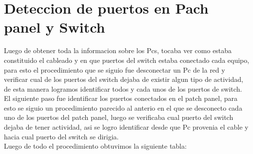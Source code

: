 \documentclass[spanish]{udpreport}
\begin{document}
\vspace{14cm}
\section{Deteccion de puertos en Pach panel y Switch}

Luego de obtener toda la informacion sobre los Pcs, tocaba ver como estaba constituido el cableado y en que puertos del switch estaba conectado cada equipo, para esto el procedimiento que se siguio fue desconectar un Pc de la red y verificar cual de los puertos del switch dejaba de existir algun tipo de actividad, de esta manera logramos identificar todos y cada unos de los puertos de switch.\\

El siguiente paso fue identificar los puertos conectados en el patch panel, para esto se siguio un procedimiento parecido al anterio en el que se desconecto cada uno de los puertos del patch panel, luego se verificaba cual puerto del switch dejaba de tener actividad, asi se logro identificar desde que Pc provenia el cable y hacia cual puerto del switch se dirigia.\\

Luego de todo el procedimiento obtuvimos la siguiente tabla:

\vspace{2cm}
\end{document}
